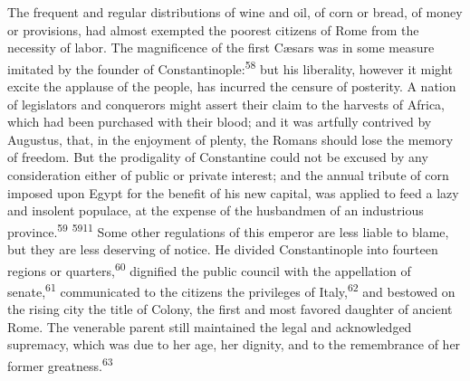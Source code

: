 The frequent and regular distributions of wine and oil, of corn
or bread, of money or provisions, had almost exempted the poorest
citizens of Rome from the necessity of labor. The magnificence of
the first Cæsars was in some measure imitated by the founder of
Constantinople:\textsuperscript{58} but his liberality, however it might excite
the applause of the people, has incurred the censure of
posterity. A nation of legislators and conquerors might assert
their claim to the harvests of Africa, which had been purchased
with their blood; and it was artfully contrived by Augustus,
that, in the enjoyment of plenty, the Romans should lose the
memory of freedom. But the prodigality of Constantine could not
be excused by any consideration either of public or private
interest; and the annual tribute of corn imposed upon Egypt for
the benefit of his new capital, was applied to feed a lazy and
insolent populace, at the expense of the husbandmen of an
industrious province.\textsuperscript{59} \textsuperscript{5911} Some other regulations of this
emperor are less liable to blame, but they are less deserving of
notice. He divided Constantinople into fourteen regions or
quarters,\textsuperscript{60} dignified the public council with the appellation of
senate,\textsuperscript{61} communicated to the citizens the privileges of Italy,\textsuperscript{62}
and bestowed on the rising city the title of Colony, the first
and most favored daughter of ancient Rome. The venerable parent
still maintained the legal and acknowledged supremacy, which was
due to her age, her dignity, and to the remembrance of her former
greatness.\textsuperscript{63}



